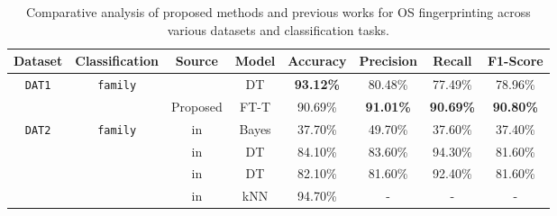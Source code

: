 \begin{table}[h!]
\centering
\caption{Comparative analysis of proposed methods and previous works for OS fingerprinting across various datasets and classification tasks.}
\vspace{5pt}
\label{tab:comparison}
\begin{tabular}{cccccccc}
\hline \hline
\textbf{Dataset}       & \textbf{Classification}          & \textbf{Source} & \textbf{Model} & \textbf{Accuracy} & \textbf{Precision} & \textbf{Recall} & \textbf{F1-Score} \\ \hline \hline
\multirow{2}{*}{\texttt{DAT1}}  & \multirow{2}{*}{\texttt{family}} & {\cellcolor{my_grey}}\cite{lastovicka_usingTLS_2020} & {\cellcolor{my_grey}}DT             & {\cellcolor{my_blue}}\textbf{93.12\%}            & {\cellcolor{my_grey}}80.48\%             & {\cellcolor{my_grey}}77.49\%          & {\cellcolor{my_grey}}78.96\%            \\
\hhline{~~------}
                       &                         & Proposed        & FT-T           & 90.69\%            & {\cellcolor{my_blue}}\textbf{91.01\%}             & {\cellcolor{my_blue}}\textbf{90.69\%}          & {\cellcolor{my_blue}}\textbf{90.80\%}            \\ \hline \hline
\multirow{12}{*}{\texttt{DAT2}} & \multirow{6}{*}{\texttt{family}} & {\cellcolor{my_grey}}\cite{beverly_robust_2004} in \cite{lastovicka_passive_2023}        & {\cellcolor{my_grey}}Bayes          & {\cellcolor{my_grey}}37.70\%           & {\cellcolor{my_grey}}49.70\%            & {\cellcolor{my_grey}}37.60\%         & {\cellcolor{my_grey}}37.40\%           \\
                       &                         & \cite{lastovicka_cybersecurity_2018} in \cite{lastovicka_passive_2023}   & DT             & 84.10\%           & 83.60\%            & 94.30\%         & 81.60\%           \\
                       &                         & {\cellcolor{my_grey}}\cite{lastovicka_usingTLS_2020} in \cite{lastovicka_passive_2023}   & {\cellcolor{my_grey}}DT             & {\cellcolor{my_grey}}82.10\%           & {\cellcolor{my_grey}}81.60\%            & {\cellcolor{my_grey}}92.40\%         & {\cellcolor{my_grey}}81.60\%           \\
                       &                         & \cite{lippmann_passive_2003} in \cite{lastovicka_passive_2023}       & kNN            & 94.70\%           & -                  & -               & -                 \\

\end{tabular}
\end{table}
